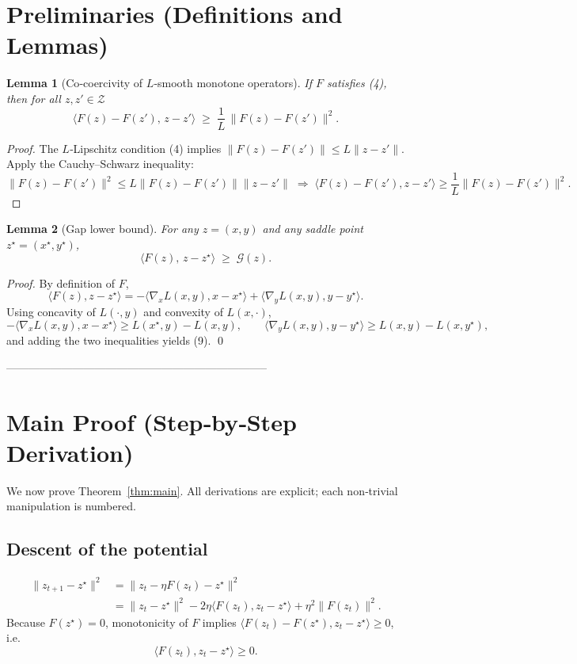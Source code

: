 \documentclass{article}
\newtheorem{lemma}{Lemma}
\begin{document}
\section*{Preliminaries (Definitions and Lemmas)}
\begin{lemma}[Co‑coercivity of $L$‑smooth monotone operators]\label{lem:coerc}
If $F$ satisfies (4), then for all $z,z'\in\mathcal Z$
\[
\langle F(z)-F(z'),\,z-z'\rangle\;\ge\;\frac{1}{L}\,
\|F(z)-F(z')\|^{2}.                                             \tag{8}
\]
\end{lemma}
\begin{proof}
The $L$‑Lipschitz condition (4) implies
$\|F(z)-F(z')\|\le L\|z-z'\|$.
Apply the Cauchy–Schwarz inequality:
\[
\|F(z)-F(z')\|^{2}\le L\|F(z)-F(z')\|\|z-z'\|
\;\Longrightarrow\;
\langle F(z)-F(z'),z-z'\rangle\ge\frac{1}{L}\|F(z)-F(z')\|^{2}.
\]
\end{proof}

\begin{lemma}[Gap lower bound]\label{lem:gap}
For any $z=(x,y)$ and any saddle point $z^{\star}=(x^{\star},y^{\star})$,
\[
\langle F(z),\,z-z^{\star}\rangle\;\ge\;\mathcal G(z).               \tag{9}
\]
\end{lemma}
\begin{proof}
By definition of $F$,
\[
\langle F(z),z-z^{\star}\rangle
= -\langle\nabla_x L(x,y),x-x^{\star}\rangle
  +\langle\nabla_y L(x,y),y-y^{\star}\rangle .
\]
Using concavity of $L(\cdot ,y)$ and convexity of $L(x,\cdot )$,
\[
-\langle\nabla_x L(x,y),x-x^{\star}\rangle
   \ge L(x^{\star},y)-L(x,y),\qquad
\langle\nabla_y L(x,y),y-y^{\star}\rangle
   \ge L(x,y)-L(x,y^{\star}),
\]
and adding the two inequalities yields (9). \hfill\qed
\end{proof}

-----------------------------------------------------------------------

\section*{Main Proof (Step‑by‑Step Derivation)}
We now prove Theorem~\ref{thm:main}.  All derivations are
explicit; each non‑trivial manipulation is numbered.

\subsection*{Descent of the potential}
\begin{align}
\|z_{t+1}-z^{\star}\|^{2}
&= \bigl\|z_t-\eta F(z_t)-z^{\star}\bigr\|^{2}                                     \tag{Step 1}\\
&= \|z_t-z^{\star}\|^{2}
   -2\eta\langle F(z_t),z_t-z^{\star}\rangle
   +\eta^{2}\|F(z_t)\|^{2}.                                                       \tag{Step 2}
\end{align}
Because $F(z^{\star})=0$, monotonicity of $F$ implies
$\langle F(z_t)-F(z^{\star}),z_t-z^{\star}\rangle\ge0$, i.e.
\[
\langle F(z_t),z_t-z^{\star}\rangle\ge0.                                          \tag{Step 3}
\]
\end{document}
